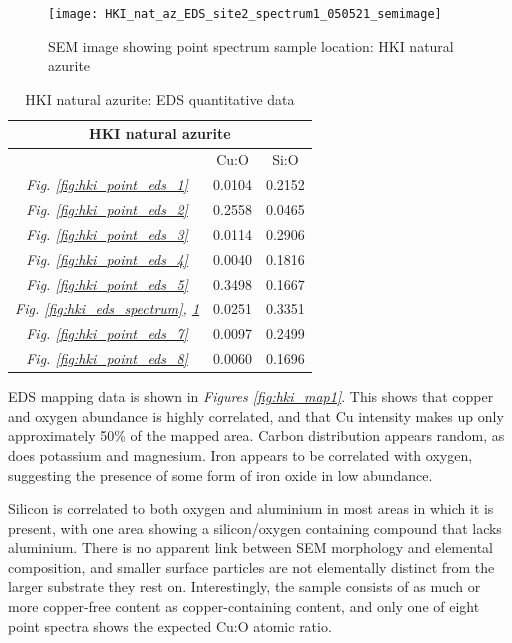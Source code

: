 \begin{figure}[H]
\centering
  \texttt{[image: HKI\_nat\_az\_EDS\_site2\_spectrum1\_050521\_semimage]}
\caption[SEM image showing point spectrum sample location: HKI natural azurite]{SEM image showing point spectrum sample location: HKI natural azurite}
\label{fig:hki_eds_sem_image}
\end{figure}

\begin{table}[H]
\caption{HKI natural azurite: EDS quantitative data}
\centering
\label{table:hki_ratios}
\begin{tabular}{c c c}
\toprule
\multicolumn{3}{c}{HKI natural azurite} \\
\midrule
~ & Cu:O & Si:O \\
\midrule
\textit{Fig. \ref{fig:hki_point_eds_1}} & 0.0104 & 0.2152 \\
\textit{Fig. \ref{fig:hki_point_eds_2}} & 0.2558 & 0.0465 \\
\textit{Fig. \ref{fig:hki_point_eds_3}} & 0.0114 & 0.2906 \\
\textit{Fig. \ref{fig:hki_point_eds_4}} & 0.0040 & 0.1816 \\
\textit{Fig. \ref{fig:hki_point_eds_5}} & 0.3498 & 0.1667 \\
\textit{Fig. \ref{fig:hki_eds_spectrum}, \ref{fig:hki_eds_sem_image}} & 0.0251 & 0.3351  \\
\textit{Fig. \ref{fig:hki_point_eds_7}} & 0.0097 & 0.2499 \\
\textit{Fig. \ref{fig:hki_point_eds_8}} & 0.0060 & 0.1696 \\
\bottomrule
\end{tabular}
\end{table}

EDS mapping data is shown in \textit{Figures \ref{fig:hki_map1}}. This shows that copper and oxygen abundance is highly correlated, and that Cu intensity makes up only approximately 50\% of the mapped area. Carbon distribution appears random, as does potassium and magnesium. Iron appears to be correlated with oxygen, suggesting the presence of some form of iron oxide in low abundance. 

Silicon is correlated to both oxygen and aluminium in most areas in which it is present, with one area showing a silicon/oxygen containing compound that lacks aluminium. There is no apparent link between SEM morphology and elemental composition, and smaller surface particles are not elementally distinct from the larger substrate they rest on. Interestingly, the sample consists of as much or more copper-free content as copper-containing content, and only one of eight point spectra shows the expected Cu:O atomic ratio. 

